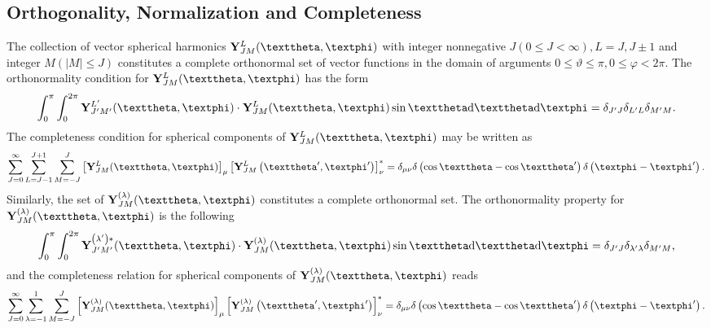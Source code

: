 \subsection{Orthogonality, Normalization and Completeness}\label{sec:7.3.13}
The collection of vector spherical harmonics $\vect{Y}_{J M}^{L}(\vartheta, \varphi)$ with integer nonnegative $J(0 \leq J<\infty), L= J, J \pm 1$ and integer $M(|M| \leq J)$ constitutes a complete orthonormal set of vector functions in the domain of arguments $0 \leq \vartheta \leq \pi, 0 \leq \varphi<2 \pi$. The orthonormality condition for $\vect{Y}_{J M}^{L}(\vartheta, \varphi)$ has the form
\begin{equation}
\int_{0}^{\pi} \int_{0}^{2 \pi} \vect{Y}_{J^{\prime} M^{\prime}}^{L^{\prime}}(\vartheta, \varphi) \cdot \vect{Y}_{J M}^{L}(\vartheta, \varphi) \sin \vartheta \dd \vartheta \dd \varphi=\delta_{J^{\prime} J} \delta_{L^{\prime} L} \delta_{M^{\prime} M}. \label{eq:7:3:121}
\end{equation}
The completeness condition for spherical components of $\vect{Y}_{J M}^{L}(\vartheta, \varphi)$ may be written as
\begin{equation}
\sum_{J=0}^{\infty} \sum_{L=J-1}^{J+1} \sum_{M=-J}^{J}\left[\vect{Y}_{J M}^{L}(\vartheta, \varphi)\right]_{\mu}\left[\vect{Y}_{J M}^{L}\left(\vartheta^{\prime}, \varphi^{\prime}\right)\right]_{\nu}^{*}=\delta_{\mu \nu} \delta\left(\cos \vartheta-\cos \vartheta^{\prime}\right) \delta\left(\varphi-\varphi^{\prime}\right). \label{eq:7:3:122}
\end{equation}
Similarly, the set of $\vect{Y}_{J M}^{(\lambda)}(\vartheta, \varphi)$ constitutes a complete orthonormal set. The orthonormality property for $\vect{Y}_{J M}^{(\lambda)}(\vartheta, \varphi)$ is the following
\begin{equation}
\int_{0}^{\pi} \int_{0}^{2 \pi} \vect{Y}_{J^{\prime} M^{\prime}}^{\left(\lambda^{\prime}\right) *}(\vartheta, \varphi) \cdot\vect{Y}_{J M}^{(\lambda)}(\vartheta, \varphi) \sin \vartheta \dd \vartheta \dd \varphi=\delta_{J^{\prime} J} \delta_{\lambda^{\prime} \lambda} \delta_{M^{\prime} M}, \label{eq:7:3:123}
\end{equation}
and the completeness relation for spherical components of $\vect{Y}_{J M}^{(\lambda)}(\vartheta, \varphi)$ reads
\begin{equation}
\sum_{J=0}^{\infty} \sum_{\lambda=-1}^{1} \sum_{M=-J}^{J}\left[\vect{Y}_{J M}^{(\lambda)}(\vartheta, \varphi)\right]_{\mu}\left[\vect{Y}_{J M}^{(\lambda)}\left(\vartheta^{\prime}, \varphi^{\prime}\right)\right]_{\nu}^{*}=\delta_{\mu \nu} \delta\left(\cos \vartheta-\cos \vartheta^{\prime}\right) \delta\left(\varphi-\varphi^{\prime}\right). \label{eq:7:3:124}
\end{equation}
